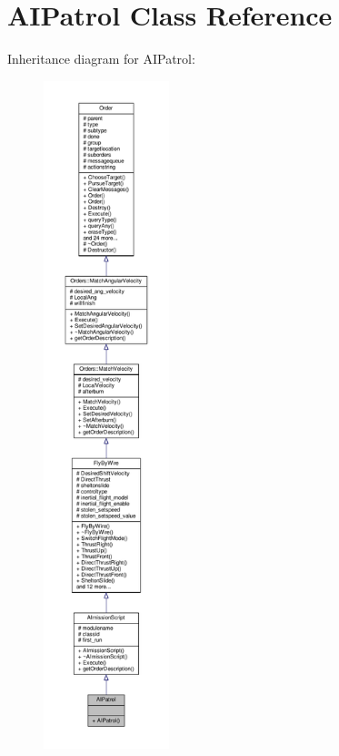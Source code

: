 \hypertarget{classAIPatrol}{}\section{A\+I\+Patrol Class Reference}
\label{classAIPatrol}


Inheritance diagram for A\+I\+Patrol\+:
\nopagebreak
\begin{figure}[H]
\begin{center}
\leavevmode
\includegraphics[height=550pt]{d6/d90/classAIPatrol__inherit__graph}
\end{center}
\end{figure}



